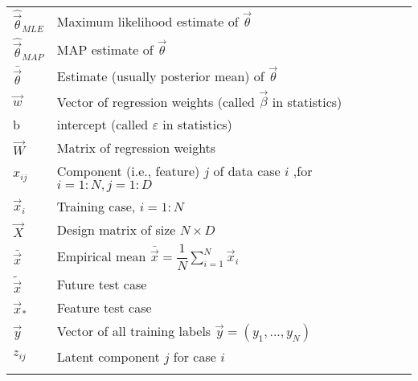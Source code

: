 \begin{longtable}{ll}
$\hat{\vec{\theta}}_{MLE}$ & Maximum likelihood estimate of $\vec{\theta}$\\
$\hat{\vec{\theta}}_{MAP}$ & MAP estimate of $\vec{\theta}$\\
$\bar{\vec{\theta}}$ & Estimate (usually posterior mean) of  $\vec{\theta}$\\
$\vec{w}$ & Vector of regression weights (called $\vec{\beta}$ in statistics)\\
b & intercept (called $\varepsilon$ in statistics)\\
$\vec{W}$ & Matrix of regression weights\\
$x_{ij}$ & Component (i.e., feature) $j$ of data case $i$ ,for $i=1:N ,j=1:D$\\
$\vec{x}_i$ & Training case, $i=1:N$\\
$\vec{X}$ & Design matrix of size $N \times D$\\
$\bar{\vec{x}}$ & Empirical mean $\bar{\vec{x}}=\dfrac{1}{N}\sum_{i=1}^{N} \vec{x}_i$\\
$\tilde{\vec{x}}$ & Future test case\\
$\vec{x}_*$ & Feature test case\\
$\vec{y}$ & Vector of all training labels $\vec{y} =(y_1,...,y_N)$\\
$z_{ij}$ & Latent component $j$ for case $i$\\
\noalign{\smallskip}\hline\noalign{\smallskip}
\end{longtable}

\twocolumn